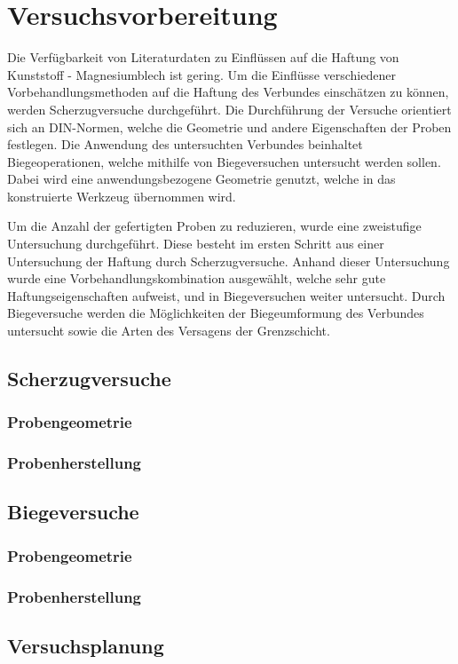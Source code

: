 \chapter{Versuchsvorbereitung}\label{cha:vorbereitung}

Die Verfügbarkeit von Literaturdaten zu Einflüssen auf die Haftung von Kunststoff - Magnesiumblech ist gering. Um die Einflüsse verschiedener Vorbehandlungsmethoden auf die Haftung des Verbundes einschätzen zu können, werden Scherzugversuche durchgeführt. Die Durchführung der Versuche orientiert sich an DIN-Normen, welche die Geometrie und andere Eigenschaften der Proben festlegen.
Die Anwendung des untersuchten Verbundes beinhaltet Biegeoperationen, welche mithilfe von Biegeversuchen untersucht werden sollen. Dabei wird eine anwendungsbezogene Geometrie genutzt, welche in das konstruierte Werkzeug übernommen wird.

Um die Anzahl der gefertigten Proben zu reduzieren, wurde eine zweistufige Untersuchung durchgeführt. Diese besteht im ersten Schritt aus einer Untersuchung der Haftung durch Scherzugversuche. Anhand dieser Untersuchung wurde eine Vorbehandlungskombination ausgewählt, welche sehr gute Haftungseigenschaften aufweist, und in Biegeversuchen weiter untersucht. Durch Biegeversuche werden die Möglichkeiten der Biegeumformung des Verbundes untersucht sowie die Arten des Versagens der Grenzschicht.

\section{Scherzugversuche}\label{sec:scherzug}

\subsection{Probengeometrie}

\subsection{Probenherstellung}

\section{Biegeversuche}\label{sec:Biegen}

\subsection{Probengeometrie}

\subsection{Probenherstellung}

\section{Versuchsplanung}\label{sec:Planung}